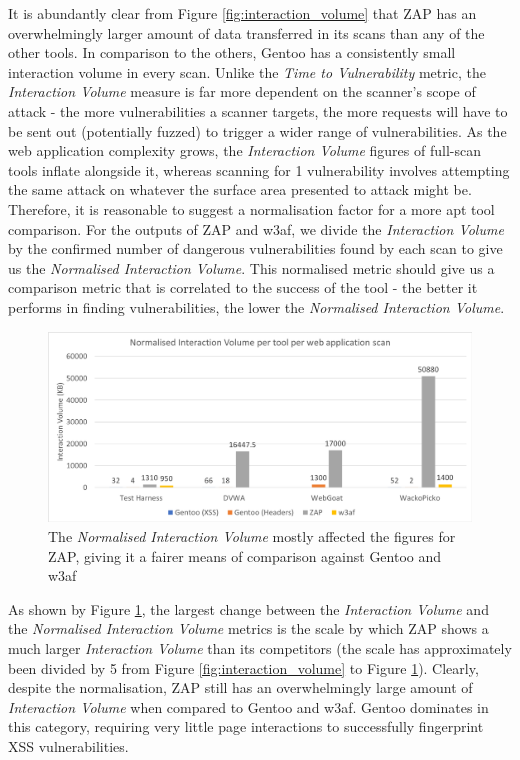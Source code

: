 It is abundantly clear from Figure \ref{fig:interaction_volume} that ZAP has an overwhelmingly larger amount of data transferred in its scans than any of the other tools. In comparison to the others, Gentoo has a consistently small interaction volume in every scan. Unlike the \textit{Time to Vulnerability} metric, the \textit{Interaction Volume} measure is far more dependent on the scanner's scope of attack - the more vulnerabilities a scanner targets, the more requests will have to be sent out (potentially fuzzed) to trigger a wider range of vulnerabilities. As the web application complexity grows, the \textit{Interaction Volume} figures of full-scan tools inflate alongside it, whereas scanning for 1 vulnerability involves attempting the same attack on whatever the surface area presented to attack might be. Therefore, it is reasonable to suggest a normalisation factor for a more apt tool comparison. For the outputs of ZAP and w3af, we divide the \textit{Interaction Volume} by the confirmed number of dangerous vulnerabilities found by each scan to give us the \textit{Normalised Interaction Volume}. This normalised metric should give us a comparison metric that is correlated to the success of the tool - the better it performs in finding vulnerabilities, the lower the \textit{Normalised Interaction Volume}.\\

\begin{figure}[h!]
	\centering
	\includegraphics[width=\textwidth]{images/evaluation/normalised_interaction_volume.png}
	\caption{The \textit{Normalised Interaction Volume} mostly affected the figures for ZAP, giving it a fairer means of comparison against Gentoo and w3af}
	\label{fig:normalised_interaction_volume}
\end{figure}

As shown by Figure \ref{fig:normalised_interaction_volume}, the largest change between the \textit{Interaction Volume} and the \textit{Normalised Interaction Volume} metrics is the scale by which ZAP shows a much larger \textit{Interaction Volume} than its competitors (the scale has approximately been divided by 5 from Figure \ref{fig:interaction_volume} to Figure \ref{fig:normalised_interaction_volume}). Clearly, despite the normalisation, ZAP still has an overwhelmingly large amount of \textit{Interaction Volume} when compared to Gentoo and w3af. Gentoo dominates in this category, requiring very little page interactions to successfully fingerprint XSS vulnerabilities. \\

